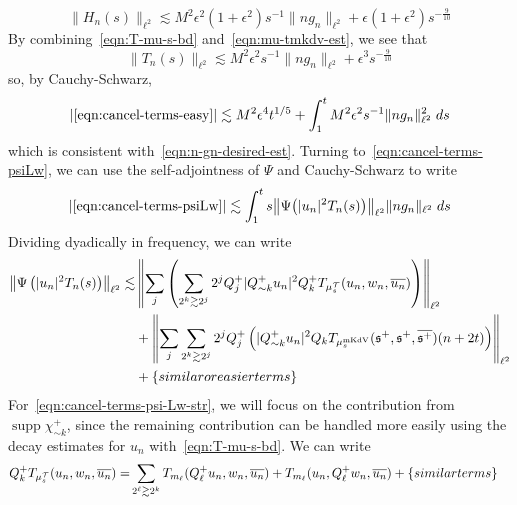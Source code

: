 \documentclass[letterpaper, reqno,final]{amsart}
\DeclareMathOperator{\supp}{supp}
\newcommand{\cT}{\mathcal{T}}
\newcommand{\fs}{\mathfrak{s}}
\newcommand{\tmkdv}{\text{mKdV}}
\newcommand{\btext}[1]{\left\{\textup{#1}\right\}}
\newcommand{\bsim}{\btext{similar terms}}
\newcommand{\bsime}{\btext{similar or easier terms}}
\begin{document}
\begin{equation*}
    \lVert H_n(s) \rVert_{\ell^2} \lesssim M^2\epsilon^2(1 + \epsilon^2) s^{-1} \lVert ng_n \rVert_{\ell^2} + \epsilon (1 + \epsilon^2) s^{-\frac{9}{10}}
\end{equation*}
By combining~\eqref{eqn:T-mu-s-bd} and~\eqref{eqn:mu-tmkdv-est}, we see that
\begin{equation}\label{eqn:T-cancel-sec-bd}
    \lVert T_n(s) \rVert_{\ell^2} \lesssim M^2\epsilon^2 s^{-1}\lVert ng_n \rVert_{\ell^2} + \epsilon^3 s^{-\frac{9}{10}}
\end{equation}
so, by Cauchy-Schwarz,
\begin{equation*}
    |\eqref{eqn:cancel-terms-easy}| \lesssim M^2 \epsilon^4 t^{1/5} + \int_1^t M^2\epsilon^2 s^{-1} \lVert ng_n \rVert_{\ell^2}^2\;ds
\end{equation*}
which is consistent with~\eqref{eqn:n-gn-desired-est}.  Turning to~\eqref{eqn:cancel-terms-psiLw}, we can use the self-adjointness of $\Psi$ and Cauchy-Schwarz to write
\begin{equation*}
    |\eqref{eqn:cancel-terms-psiLw}| \lesssim \int_1^t s \bigl\lVert \Psi \bigl( |u_n|^2 T_n(s)\bigr) \bigr\rVert_{\ell^2} \lVert ng_n \rVert_{\ell^2}\;ds
\end{equation*}
Dividing dyadically in frequency, we can write
\begin{subequations}\begin{align}
    \left\lVert\Psi \left( |u_n|^2 T_n(s)\right)\right\rVert_{\ell^2} \lesssim& \left\lVert\sum_{j} \left(\sum_{2^k \gtrsim 2^j} 2^j Q_j^+  |Q_{\sim k}^+ u_n|^2 Q_k^+ T_{\mu_s^\cT}(u_n, w_n, \overline{u_n}) \right)\right\rVert_{\ell^2}\label{eqn:cancel-terms-psi-Lw-str}\\
    &+ \left\lVert\sum_{j} \sum_{2^k \gtrsim 2^j} 2^j  Q_j^+ \left( |Q_{\sim k}^+ u_n|^2 Q_k T_{\mu_s^\tmkdv}(\fs^+, \fs^+, \overline{\fs^+}) (n + 2t) \right)\right\rVert_{\ell^2}\label{eqn:cancel-terms-psi-Lw-ss}\\
    &+ \bsime\notag
\end{align}\end{subequations}
For~\eqref{eqn:cancel-terms-psi-Lw-str}, we will focus on the contribution from $\supp \chi_{\sim k}^+$, since the remaining contribution can be handled more easily using the decay estimates for $u_n$ with~\eqref{eqn:T-mu-s-bd}.  We can write
\begin{equation*}\begin{split}
    Q_k^+ T_{\mu_s^\cT}(u_n, w_n, \overline{u_n}) =& \sum_{2^\ell \gtrsim 2^k} T_{m_\ell}(Q_\ell^+ u_n, w_n, \overline{u_n}) + T_{m_\ell}(u_n, Q_\ell^+ w_n, \overline{u_n}) + \bsim
\end{split}\end{equation*}
\end{document}
